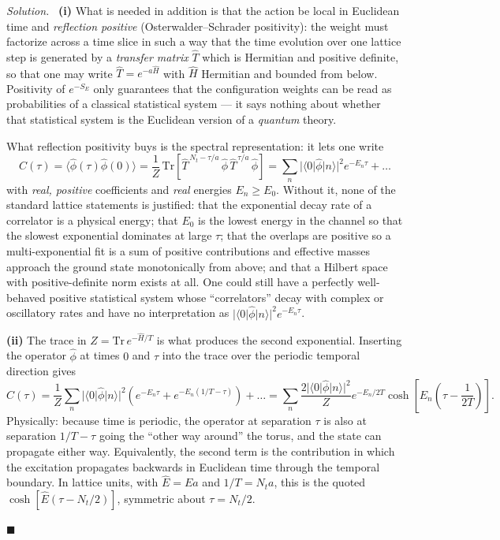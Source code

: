 \documentclass[11pt]{article}
\newenvironment{solution}{\par\smallskip\noindent\textit{Solution.}\ }{\hfill$\blacksquare$\par\smallskip}
\begin{document}
\begin{solution}
\textbf{(i)} What is needed in addition is that the action be local in Euclidean time and \emph{reflection positive} (Osterwalder--Schrader positivity): the weight must factorize across a time slice in such a way that the time evolution over one lattice step is generated by a \emph{transfer matrix} $\hat T$ which is Hermitian and positive definite, so that one may write $\hat T = e^{-a\hat H}$ with $\hat H$ Hermitian and bounded from below. Positivity of $e^{-S_E}$ only guarantees that the configuration weights can be read as probabilities of a classical statistical system --- it says nothing about whether that statistical system is the Euclidean version of a \emph{quantum} theory.

What reflection positivity buys is the spectral representation: it lets one write
\begin{equation}
C(\tau) = \langle \hat\phi(\tau)\hat\phi(0)\rangle = \frac{1}{Z}\,\mathrm{Tr}\!\left[\hat T^{\,N_t-\tau/a}\,\hat\phi\,\hat T^{\,\tau/a}\,\hat\phi\right]
= \sum_n |\langle 0|\hat\phi|n\rangle|^2 e^{-E_n \tau} + \dots
\end{equation}
with \emph{real, positive} coefficients and \emph{real} energies $E_n \geq E_0$. Without it, none of the standard lattice statements is justified: that the exponential decay rate of a correlator is a physical energy; that $E_0$ is the lowest energy in the channel so that the slowest exponential dominates at large $\tau$; that the overlaps are positive so a multi-exponential fit is a sum of positive contributions and effective masses approach the ground state monotonically from above; and that a Hilbert space with positive-definite norm exists at all. One could still have a perfectly well-behaved positive statistical system whose ``correlators'' decay with complex or oscillatory rates and have no interpretation as $|\langle 0|\hat\phi|n\rangle|^2 e^{-E_n\tau}$.

\textbf{(ii)} The trace in $Z = \mathrm{Tr}\,e^{-\hat H/T}$ is what produces the second exponential. Inserting the operator $\hat\phi$ at times $0$ and $\tau$ into the trace over the periodic temporal direction gives
\begin{equation}
C(\tau) = \frac{1}{Z}\sum_n |\langle 0|\hat\phi|n\rangle|^2 \left( e^{-E_n \tau} + e^{-E_n (1/T - \tau)} \right) + \dots
= \sum_n \frac{2|\langle 0|\hat\phi|n\rangle|^2}{Z} e^{-E_n/2T}\cosh\!\left[E_n\left(\tau - \frac{1}{2T}\right)\right].
\end{equation}
Physically: because time is periodic, the operator at separation $\tau$ is also at separation $1/T - \tau$ going the ``other way around'' the torus, and the state can propagate either way. Equivalently, the second term is the contribution in which the excitation propagates backwards in Euclidean time through the temporal boundary. In lattice units, with $\hat E = E a$ and $1/T = N_t a$, this is the quoted $\cosh[\hat E(\tau - N_t/2)]$, symmetric about $\tau = N_t/2$.


\end{solution}
\end{document}
